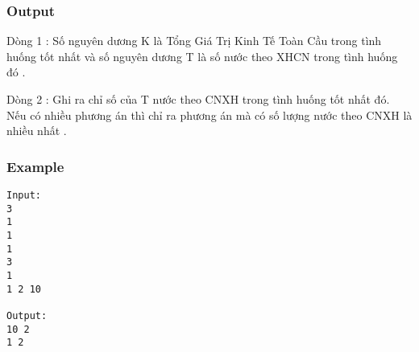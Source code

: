 \subsubsection{   Output  }

   Dòng 1 : Số nguyên dương K là Tổng Giá Trị Kinh Tế Toàn Cầu trong tình huống tốt nhất và số nguyên dương T là số nước theo XHCN trong tình huống đó .   


   Dòng 2 : Ghi ra chỉ số của T nước theo CNXH trong tình huống tốt nhất đó. Nếu có nhiều phương án thì chỉ ra phương án mà có số lượng nước theo CNXH là nhiều nhất .  

\subsubsection{   Example  }
\begin{verbatim}
Input:
3
1
1
1
3
1
1 2 10

Output:
10 2
1 2

\end{verbatim}
